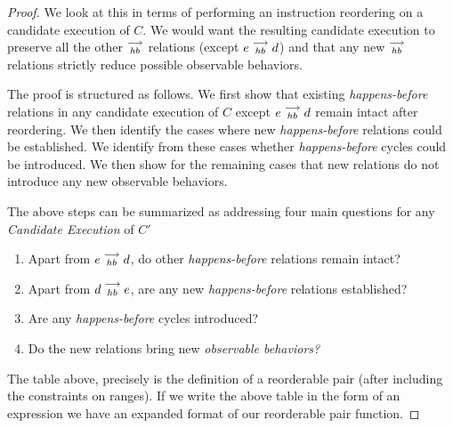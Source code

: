 \begin{proof}

    We look at this in terms of performing an instruction reordering on a candidate execution of $C$. We would want the resulting candidate execution to preserve all the other $\stackrel{\longrightarrow}{_{hb}}$ relations (except $e\stackrel{\longrightarrow}{_{hb}}d$) and that any new $\stackrel{\longrightarrow}{_{hb}}$ relations strictly reduce possible observable behaviors.
    
    The proof is structured as follows. We first show that existing \textit{happens-before} relations in any candidate execution of $C$ except $e\stackrel{\longrightarrow}{_{hb}}d$ remain intact after reordering. We then identify the cases where new \textit{happens-before} relations could be established. We identify from these cases whether \textit{happens-before} cycles could be introduced.
    We then show for the remaining cases that new relations do not introduce any new observable behaviors.

    The above steps can be summarized as addressing four main questions for any \textit{Candidate Execution} of $C'$
    \begin{enumerate}
        \item Apart from $e\stackrel{\longrightarrow}{_{hb}}d$, do other \emph{happens-before} relations remain intact?
        \item Apart from $d\stackrel{\longrightarrow}{_{hb}}e$, are any new \emph{happens-before} relations established? 
        \item Are any \emph{happens-before} cycles introduced? 
        \item Do the new relations bring new \emph{observable behaviors?}
    \end{enumerate}
    
    
    
    
    

    The table above, precisely is the definition of a reorderable pair (after including the constraints on ranges). If we write the above table in the form of an expression we have an expanded format of our reorderable pair function. 


\end{proof}
